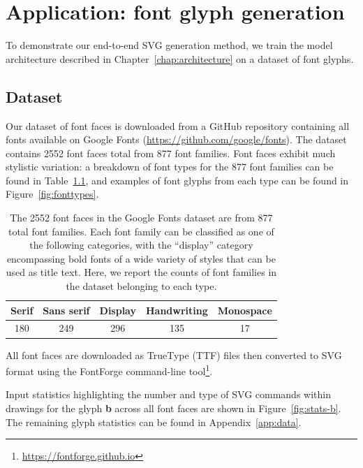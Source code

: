 \chapter{Application: font glyph generation}\label{chap:training} To demonstrate our end-to-end SVG generation method, we train the model architecture described in Chapter~\ref{chap:architecture} on a dataset of font glyphs.

\section{Dataset}\label{sec:font-data}
Our dataset of font faces is downloaded from a GitHub repository containing all fonts available on Google Fonts (\url{https://github.com/google/fonts}).
The dataset contains 2552 font faces total from 877 font families.
Font faces exhibit much stylistic variation: a breakdown of font types for the 877 font families can be found in Table~\ref{tbl:fonttypes}, and examples of font glyphs from each type can be found in Figure~\ref{fig:fonttypes}.

\begin{table}[h]
\centering
\caption[A breakdown of font types in the Google Fonts dataset]
    {The 2552 font faces in the Google Fonts dataset are from 877 total font families.
    Each font family can be classified as one of the following categories, with the ``display'' category encompassing bold fonts of a wide variety of styles that can be used as title text.
    Here, we report the counts of font families in the dataset belonging to each type.\label{tbl:fonttypes}}
\begin{tabular}{c c c c c}
\toprule
    Serif & Sans serif & Display & Handwriting & Monospace \\ \midrule
    180 & 249 & 296 & 135 & 17
\end{tabular}
\end{table}

All font faces are downloaded as TrueType (TTF) files then converted to SVG format using the FontForge command-line tool\footnote{\url{https://fontforge.github.io}}.

Input statistics highlighting the number and type of SVG commands within drawings for the glyph \textbf{b} across all font faces are shown in Figure~\ref{fig:stats-b}.
The remaining glyph statistics can be found in Appendix~\ref{app:data}.

